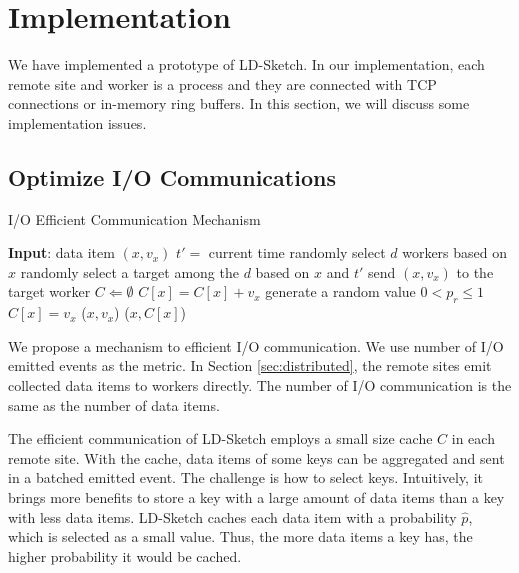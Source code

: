 \section{Implementation}
\label{sec:impl}

We have implemented a prototype of LD-Sketch.
In our implementation, each remote site and worker is a process
and they are connected with TCP connections or in-memory ring buffers.
In this section, we will discuss some implementation issues.

\subsection{Optimize I/O Communications}

\begin{algorithm}[t]
\caption{I/O Efficient Communication Mechanism}
\label{alg:io}
\begin{small}
\begin{algorithmic}[1]
\item[{\bf Input}: data item $(x, v_x)$]
  \State $t' = $ current time
  \State randomly select $d$ workers based on $x$
  \State randomly select a target among the $d$ based on $x$ and $t'$
  \State send $(x, v_x)$ to the target worker
\EndFunction
\State
{}
  \State $C \Leftarrow \emptyset$
      \State $C[x] = C[x] + v_x$
    \Else
      \State generate a random value $0<p_{r}\le 1$
        \State $C[x] = v_x$
      \Else
        ($x, v_x$)
      \EndIf
    \EndIf
  \EndFor
    ($x, C[x]$)
  \EndFor
\EndProcedure
\end{algorithmic}
\end{small}
\end{algorithm}

We propose a mechanism to efficient I/O communication.
We use number of I/O emitted events as the metric.
In Section \ref{sec:distributed}, the remote sites emit collected data items to workers directly.
The number of I/O communication is the same as the number of data items.

The efficient communication of LD-Sketch employs a small size cache $C$ in each remote site.
With the cache, data items of some keys can be aggregated and sent in a batched emitted event.
The challenge is how to select keys.
Intuitively, it brings more benefits to store a key with a large amount of data items than a key with less data items.
LD-Sketch caches each data item with a probability $\hat{p}$, which is selected as a small value.
Thus, the more data items a key has, the higher probability it would be cached.

